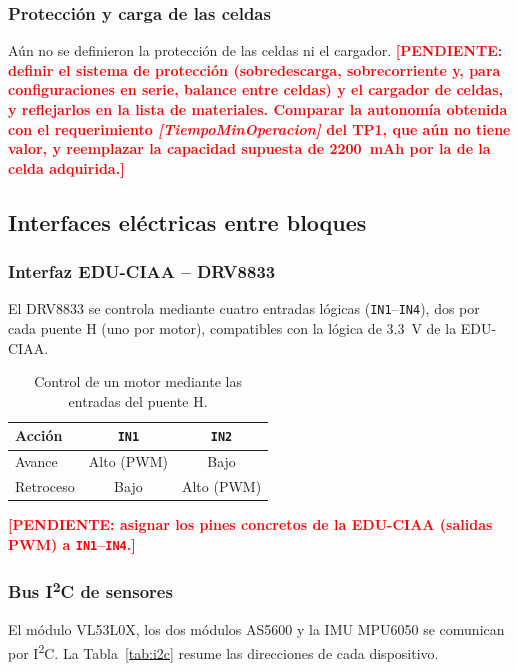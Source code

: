 \documentclass[12pt,a4paper]{article}
\newcommand{\pendiente}[1]{\textcolor{red}{\textbf{[PENDIENTE: #1]}}}
\newcommand{\vr}{\rowcolor{yellow!50}}
\begin{document}
\subsubsection{Protección y carga de las celdas}
Aún no se definieron la protección de las celdas ni el cargador.
\pendiente{definir el sistema de protección (sobredescarga, sobrecorriente y, para configuraciones en serie, balance entre celdas) y el cargador de celdas, y reflejarlos en la lista de materiales. Comparar la autonomía obtenida con el requerimiento \textit{[TiempoMinOperacion]} del TP1, que aún no tiene valor, y reemplazar la capacidad supuesta de \SI{2200}{mAh} por la de la celda adquirida.}

\subsection{Interfaces eléctricas entre bloques}
\subsubsection{Interfaz EDU-CIAA -- DRV8833}
El DRV8833 se controla mediante cuatro entradas lógicas (\texttt{IN1}--\texttt{IN4}), dos por cada puente H (uno por motor), compatibles con la lógica de \SI{3,3}{V} de la EDU-CIAA.

\begin{table}[H]
\centering
\caption{Control de un motor mediante las entradas del puente H.}
\label{tab:logica}
\begin{tabular}{lcc}
\toprule
Acción & \texttt{IN1} & \texttt{IN2} \\
\midrule
\vr Avance & Alto (PWM) & Bajo \\
\vr Retroceso & Bajo & Alto (PWM) \\
\bottomrule
\end{tabular}
\end{table}

\pendiente{asignar los pines concretos de la EDU-CIAA (salidas PWM) a \texttt{IN1}--\texttt{IN4}.}

\subsubsection{Bus \texorpdfstring{I\textsuperscript{2}C}{I2C} de sensores}
El módulo VL53L0X, los dos módulos AS5600 y la IMU MPU6050 se comunican por I\textsuperscript{2}C. La Tabla~\ref{tab:i2c} resume las direcciones de cada dispositivo.
\end{document}
